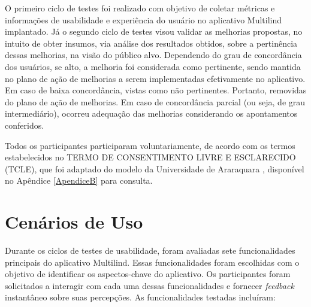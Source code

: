 O primeiro ciclo de testes foi realizado com objetivo de coletar métricas e informações de usabilidade e experiência do usuário no aplicativo Multilind implantado. Já o segundo ciclo de testes visou validar as 
melhorias propostas, no intuito de obter insumos, via análise dos resultados obtidos, sobre a pertinência dessas melhorias, na visão do público alvo. Dependendo do grau de concordância dos usuários, se alto, a 
melhoria foi considerada como pertinente, sendo mantida no plano de ação de melhorias a serem implementadas efetivamente no aplicativo. Em caso de baixa concordância, vistas como não pertinentes. Portanto, removidas 
do plano de ação de melhorias. Em caso de concordância parcial (ou seja, de grau intermediário), ocorreu adequação das melhorias considerando os apontamentos conferidos. 

Todos os participantes participaram voluntariamente, de acordo com os termos estabelecidos no  TERMO DE CONSENTIMENTO LIVRE E ESCLARECIDO (TCLE), que foi adaptado do modelo da Universidade de Araraquara \cite{tcle}, 
disponível no Apêndice \ref{ApendiceB} para consulta.

\section{Cenários de Uso}
\label{sec:Cenários de Uso}
Durante os ciclos de testes de usabilidade, foram avaliadas sete funcionalidades principais do aplicativo Multilind. Essas funcionalidades foram escolhidas com o objetivo de identificar os aspectos-chave do 
aplicativo. Os participantes foram solicitados a interagir com cada uma dessas funcionalidades e fornecer \textit{feedback} instantâneo sobre suas percepções. As funcionalidades testadas incluíram:

